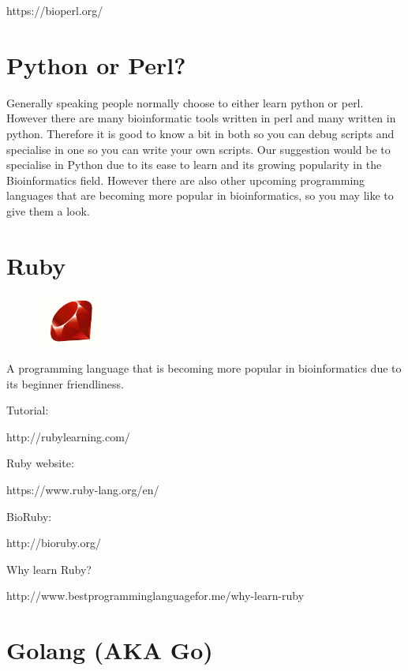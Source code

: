 \documentclass[
  letterpaper,
  DIV=11,
  numbers=noendperiod]{scrreprt}
\begin{document}
https://bioperl.org/

\hypertarget{python-or-perl}{%
\section{Python or Perl?}\label{python-or-perl}}

Generally speaking people normally choose to either learn python or
perl. However there are many bioinformatic tools written in perl and
many written in python. Therefore it is good to know a bit in both so
you can debug scripts and specialise in one so you can write your own
scripts. Our suggestion would be to specialise in Python due to its ease
to learn and its growing popularity in the Bioinformatics field. However
there are also other upcoming programming languages that are becoming
more popular in bioinformatics, so you may like to give them a look.

\hypertarget{ruby}{%
\section{Ruby}\label{ruby}}

\begin{figure}

{\centering \includegraphics[width=0.2\textwidth,height=\textheight]{figures/ruby.png}

}

\end{figure}

A programming language that is becoming more popular in bioinformatics
due to its beginner friendliness.

Tutorial:

http://rubylearning.com/

Ruby website:

https://www.ruby-lang.org/en/

BioRuby:

http://bioruby.org/

Why learn Ruby?

http://www.bestprogramminglanguagefor.me/why-learn-ruby

\hypertarget{golang-aka-go}{%
\section{Golang (AKA Go)}\label{golang-aka-go}}
\end{document}
